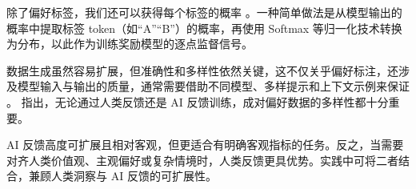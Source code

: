 除了偏好标签，我们还可以获得每个标签的概率 \cite{lee-etal:2023rlaif}。一种简单做法是从模型输出的概率中提取标签 token（如“A”“B”）的概率，再使用 Softmax 等归一化技术转换为分布，以此作为训练奖励模型的逐点监督信号。

数据生成虽然容易扩展，但准确性和多样性依然关键，这不仅关乎偏好标注，还涉及模型输入与输出的质量，通常需要借助不同模型、多样提示和上下文示例来保证 \cite{cui-etal:2024ultra}。\citet{dubois-etal:2024alpacafarm} 指出，无论通过人类反馈还是 AI 反馈训练，成对偏好数据的多样性都十分重要。

AI 反馈高度可扩展且相对客观，但更适合有明确客观指标的任务。反之，当需要对齐人类价值观、主观偏好或复杂情境时，人类反馈更具优势。实践中可将二者结合，兼顾人类洞察与 AI 反馈的可扩展性。











